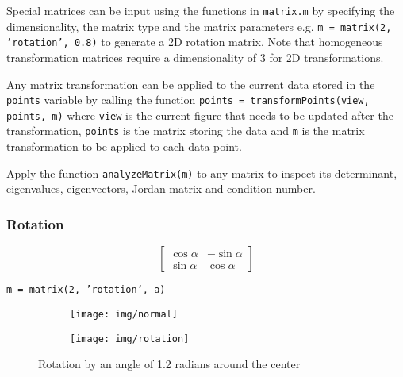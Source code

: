 \documentclass{scrartcl}
\begin{document}
Special matrices can be input using the functions in \texttt{matrix.m} by specifying the dimensionality, the matrix type and the matrix parameters e.g. \texttt{m = matrix(2, 'rotation', 0.8)} to generate a 2D rotation matrix. Note that homogeneous transformation matrices require a dimensionality of 3 for 2D transformations.

Any matrix transformation can be applied to the current data stored in the \texttt{points} variable by calling the function \texttt{points = transformPoints(view, points, m)} where \texttt{view} is the current figure that needs to be updated after the transformation, \texttt{points} is the matrix storing the data and \texttt{m} is the matrix transformation to be applied to each data point.

Apply the function \texttt{analyzeMatrix(m)} to any matrix to inspect its determinant, eigenvalues, eigenvectors, Jordan matrix and condition number.
\subsubsection*{Rotation}
$$\left[ \begin{smallmatrix} 
	\cos\alpha & -\sin\alpha\\
	\sin\alpha & \cos\alpha 
\end{smallmatrix} \right]$$
\begin{center}\texttt{m = matrix(2, 'rotation', a)}\end{center}
\begin{figure}[H]
	\centering
	\begin{subfigure}{.41\textwidth}
		\centering
		\texttt{[image: img/normal]}
	\end{subfigure}%
	\begin{subfigure}{.41\textwidth}
		\centering
		\texttt{[image: img/rotation]}
	\end{subfigure}
	\caption{Rotation by an angle of 1.2 radians around the center}
	\label{fig:rot}
\end{figure}
\end{document}
